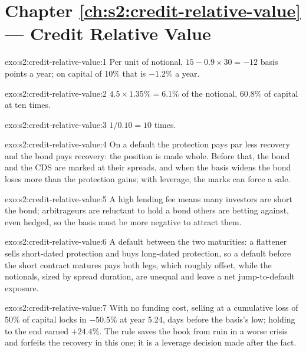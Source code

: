 \section*{Chapter \ref{ch:s2:credit-relative-value} --- Credit Relative Value}

\begin{solution}{exo:s2:credit-relative-value:1}
Per unit of notional, $15 - 0.9 \times 30 = -12$ basis points a year; on capital of 10\% that is $-1.2\%$ a year.
\end{solution}

\begin{solution}{exo:s2:credit-relative-value:2}
$4.5 \times 1.35\% = 6.1\%$ of the notional, $60.8\%$ of capital at ten times.
\end{solution}

\begin{solution}{exo:s2:credit-relative-value:3}
$1/0.10 = 10$ times.
\end{solution}

\begin{solution}{exo:s2:credit-relative-value:4}
On a default the protection pays par less recovery and the bond pays recovery: the position is made whole. Before that, the bond and the CDS are marked
at their spreads, and when the basis widens the bond loses more than the protection gains; with leverage, the marks can force a sale.
\end{solution}

\begin{solution}{exo:s2:credit-relative-value:5}
A high lending fee means many investors are short the bond; arbitrageurs are reluctant to hold a bond others are betting against, even hedged, so the
basis must be more negative to attract them.
\end{solution}

\begin{solution}{exo:s2:credit-relative-value:6}
A default between the two maturities: a flattener sells short-dated protection and buys long-dated protection, so a default before the short contract
matures pays both legs, which roughly offset, while the notionals, sized by spread duration, are unequal and leave a net jump-to-default exposure.
\end{solution}

\begin{solution}{exo:s2:credit-relative-value:7}
With no funding cost, selling at a cumulative loss of 50\% of capital locks in $-50.5\%$ at year 5.24, days before the basis's low; holding to the end
earned $+24.4\%$. The rule saves the book from ruin in a worse crisis and forfeits the recovery in this one; it is a leverage decision made after the
fact.
\end{solution}

